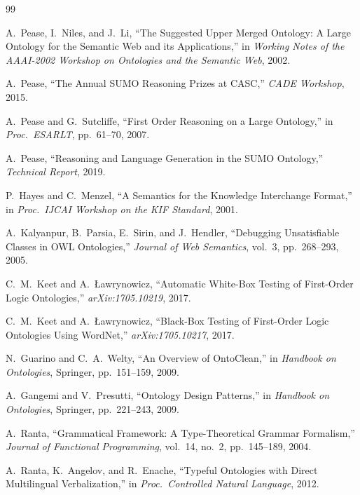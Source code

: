 \documentclass[11pt]{article}
\theoremstyle{definition}
\theoremstyle{plain}
\begin{document}
\begin{thebibliography}{99}

A.~Pease, I.~Niles, and J.~Li,
``The Suggested Upper Merged Ontology: A Large Ontology for the Semantic
Web and its Applications,''
in \textit{Working Notes of the AAAI-2002 Workshop on Ontologies and the
Semantic Web}, 2002.

A.~Pease,
``The Annual SUMO Reasoning Prizes at CASC,''
\textit{CADE Workshop}, 2015.

A.~Pease and G.~Sutcliffe,
``First Order Reasoning on a Large Ontology,''
in \textit{Proc.\ ESARLT}, pp.~61--70, 2007.

A.~Pease,
``Reasoning and Language Generation in the SUMO Ontology,''
\textit{Technical Report}, 2019.

P.~Hayes and C.~Menzel,
``A Semantics for the Knowledge Interchange Format,''
in \textit{Proc.\ IJCAI Workshop on the KIF Standard}, 2001.

A.~Kalyanpur, B.~Parsia, E.~Sirin, and J.~Hendler,
``Debugging Unsatisfiable Classes in OWL Ontologies,''
\textit{Journal of Web Semantics}, vol.~3, pp.~268--293, 2005.

C.~M.~Keet and A.~\L{}awrynowicz,
``Automatic White-Box Testing of First-Order Logic Ontologies,''
\textit{arXiv:1705.10219}, 2017.

C.~M.~Keet and A.~\L{}awrynowicz,
``Black-Box Testing of First-Order Logic Ontologies Using WordNet,''
\textit{arXiv:1705.10217}, 2017.

N.~Guarino and C.~A.~Welty,
``An Overview of OntoClean,''
in \textit{Handbook on Ontologies}, Springer, pp.~151--159, 2009.

A.~Gangemi and V.~Presutti,
``Ontology Design Patterns,''
in \textit{Handbook on Ontologies}, Springer, pp.~221--243, 2009.

A.~Ranta,
``Grammatical Framework: A Type-Theoretical Grammar Formalism,''
\textit{Journal of Functional Programming}, vol.~14, no.~2, pp.~145--189,
2004.

A.~Ranta, K.~Angelov, and R.~Enache,
``Typeful Ontologies with Direct Multilingual Verbalization,''
in \textit{Proc.\ Controlled Natural Language}, 2012.


\end{thebibliography}
\end{document}
